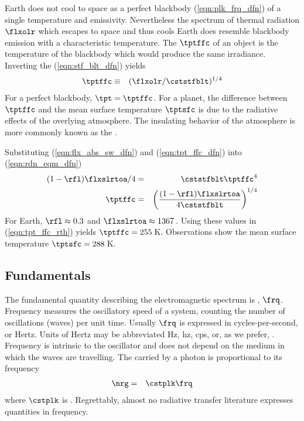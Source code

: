 \documentclass[12pt]{article}
\begin{document}
Earth does not cool to space as a perfect blackbody
(\ref{eqn:plk_frq_dfn}) of a single temperature and emissivity.
Nevertheless the spectrum of thermal radiation $\flxolr$ which escapes
to space and thus cools Earth does resemble blackbody emission with a
characteristic temperature.
The  $\tptffc$ of an object is the
temperature of the blackbody which would produce the same irradiance.
Inverting the  (\ref{eqn:stf_blt_dfn})
yields
\begin{eqnarray}
\tptffc & \equiv & ( \flxolr / \cststfblt )^{1/4}
\label{eqn:tpt_ffc_dfn}
\end{eqnarray}
For a perfect blackbody, $\tpt = \tptffc$.
For a planet, the difference between $\tptffc$ and the mean surface 
temperature $\tptsfc$ is due to the radiative effects of the overlying
atmosphere.
The insulating behavior of the atmosphere is more commonly known as
the .

Substituting (\ref{eqn:flx_abs_sw_dfn}) and (\ref{eqn:tpt_ffc_dfn})
into (\ref{eqn:rdn_eqm_dfn})
\begin{eqnarray}
(1 - \rfl) \flxslrtoa / 4 & = & \cststfblt \tptffc^{4} \\
\tptffc & = & \left( \frac{(1 - \rfl) \flxslrtoa}
{4 \cststfblt} \right)^{1/4}
\label{eqn:tpt_ffc_rth}
\end{eqnarray}
For Earth, $\rfl \approx 0.3$ and $\flxslrtoa \approx 1367$\,\wxmS.
Using these values in (\ref{eqn:tpt_ffc_rth}) yields $\tptffc =
255$\,K\@.
Observations show the mean surface temperature $\tptsfc = 288$\,K\@.

\subsection[Fundamentals]{Fundamentals}\label{sxn:fnd}
The fundamental quantity describing the electromagnetic spectrum is
, $\frq$.
Frequency measures the oscillatory speed of a system, counting the
number of oscillations (waves) per unit time.
Usually $\frq$ is expressed in cycles-per-second, or Hertz.
Units of Hertz may be abbreviated Hz, hz, cps, or, as we prefer, \xs.
Frequency is intrinsic to the oscillator and does not depend on the
medium in which the waves are travelling.
The  carried by a photon is proportional to its
frequency 
\begin{eqnarray}
\nrg & = & \cstplk \frq
\label{eqn:nrg_dfn}
\end{eqnarray}
where $\cstplk$ is .
Regrettably, almost no radiative transfer literature expresses
quantities in frequency.
\end{document}
